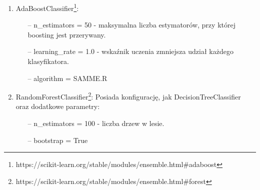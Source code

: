 \documentclass[polish,12pt]{aghthesis}
\begin{document}
\begin{itemize}
\begin{enumerate}
            \begin{itemize}
                \setlength\itemsep{0,1em}
                \item[--] criterion = gini - funkcja mierząca jakość podziału.
                
                \item[--] splitter = best - strategia służąca do wyboru podziału dla węzła. Może być wybrana najlepsza, bądź losowa.
                
                \item[--] min\_samples\_split = 2 - minimalna liczba próbek wymagana do podzielenia węzła wewnętrznego.
                
                \item[--] min\_samples\_leaf = 1 - minimalna liczba próbek, która musi znajdować się w liścu.
            \end{itemize}
            
            Pozostałe parametry takie, jak maksymalna liczba w drzewie, czy też wagi klas nie są ustawiane.
            
        \item AdaBoostClassifier\footnote{https://scikit-learn.org/stable/modules/ensemble.html\#adaboost}:
            
            \begin{itemize}
                \setlength\itemsep{0,1em}
                \item[--] n\_estimators = 50 - maksymalna liczba estymatorów, przy której boosting jest przerywany.
                
                \item[--] learning\_rate = 1.0 - wskaźnik uczenia zmniejsza udział każdego klasyfikatora.
                
                \item[--] algorithm = SAMME.R 
            \end{itemize}
            
        \item RandomForestClassifier\footnote{https://scikit-learn.org/stable/modules/ensemble.html\#forest}:
            Posiada konfigurację, jak DecisionTreeClassifier oraz dodatkowe parametry:
            
            \begin{itemize}
                \setlength\itemsep{0,1em}
                \item[--] n\_estimators = 100 - liczba drzew w lesie.
                \item[--] bootstrap = True
            \end{itemize}
        

\end{enumerate}
\end{itemize}
\end{document}
